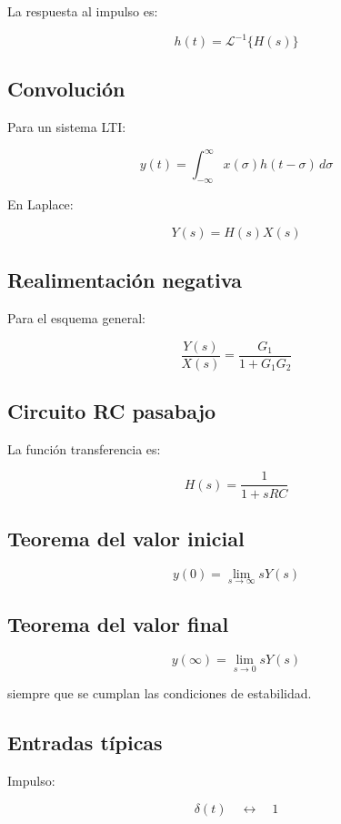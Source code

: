 \documentclass[12pt,a4paper]{article}
\begin{document}
La respuesta al impulso es:

\[
\boxed{
h(t)=\mathcal{L}^{-1}\{H(s)\}
}
\]

\subsection*{Convolución}

Para un sistema LTI:

\[
\boxed{
y(t)=
\int_{-\infty}^{\infty}
x(\sigma)h(t-\sigma)\,d\sigma
}
\]

En Laplace:

\[
\boxed{
Y(s)=H(s)X(s)
}
\]

\subsection*{Realimentación negativa}

Para el esquema general:

\[
\boxed{
\frac{Y(s)}{X(s)}
=
\frac{G_1}{1+G_1G_2}
}
\]

\subsection*{Circuito RC pasabajo}

La función transferencia es:

\[
\boxed{
H(s)=\frac{1}{1+sRC}
}
\]

\subsection*{Teorema del valor inicial}

\[
\boxed{
y(0)=
\lim_{s\rightarrow\infty}sY(s)
}
\]

\subsection*{Teorema del valor final}

\[
\boxed{
y(\infty)=
\lim_{s\rightarrow0}sY(s)
}
\]

siempre que se cumplan las condiciones de estabilidad.

\subsection*{Entradas típicas}

Impulso:

\[
\delta(t)
\quad\longleftrightarrow\quad
1
\]
\end{document}

